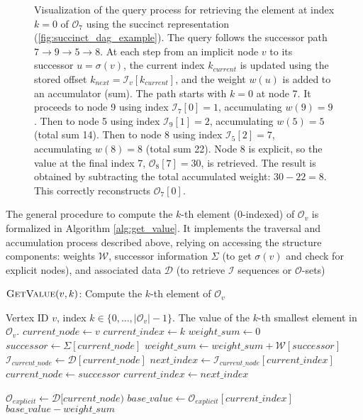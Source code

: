 \begin{figure}[htbp]
    \caption{Visualization of the query process for retrieving the element at index $k=0$ of $\mathcal{O}_7$ using the succinct representation (\autoref{fig:succinct_dag_example}). The query follows the successor path $7 \to 9 \to 5 \to 8$. At each step from an implicit node $v$ to its successor $u=\sigma(v)$, the current index $k_{current}$ is updated using the stored offset $k_{next} = \mathcal{I}_v[k_{current}]$, and the weight $w(u)$ is added to an accumulator (sum). The path starts with $k=0$ at node 7. It proceeds to node 9 using index $\mathcal{I}_7[0]=1$, accumulating $w(9)=9$. Then to node 5 using index $\mathcal{I}_9[1]=2$, accumulating $w(5)=5$ (total sum 14). Then to node 8 using index $\mathcal{I}_5[2]=7$, accumulating $w(8)=8$ (total sum 22). Node 8 is explicit, so the value at the final index 7, $\mathcal{O}_8[7]=30$, is retrieved. The result is obtained by subtracting the total accumulated weight: $30 - 22 = 8$. This correctly reconstructs $\mathcal{O}_7[0]$.}
    \label{fig:query_path_node7}
\end{figure}

The general procedure to compute the $k$-th element ($0$-indexed) of $\mathcal{O}_v$ is formalized in Algorithm \ref{alg:get_value}. It implements the traversal and accumulation process described above, relying on accessing the structure components: weights $\mathcal{W}$, successor information $\Sigma$ (to get $\sigma(v)$ and check for explicit nodes), and associated data $\mathcal{D}$ (to retrieve $\mathcal{I}$ sequences or $\mathcal{O}$-sets)

\begin{algorithm}
    \caption{$\textsc{GetValue}(v, k)$: Compute the $k$-th element of $\mathcal{O}_v$}
    \label{alg:get_value}
    \small
    \begin{algorithmic}[1]
        \Require Vertex ID $v$, index $k \in \{0, \dots, |\mathcal{O}_v|-1\}$.
        \Ensure The value of the $k$-th smallest element in $\mathcal{O}_v$.
        \State $current\_node \gets v$
        \State $current\_index \gets k$
        \State $weight\_sum \gets 0$
        \State $successor \gets \Sigma[current\_node]$
        \State $weight\_sum \gets weight\_sum + \mathcal{W}[successor]$
        \State $\mathcal{I}_{current\_node} \gets \mathcal{D}[current\_node]$
        \State $next\_index \gets \mathcal{I}_{current\_node}[current\_index]$
        \State $current\_node \gets successor$
        \State $current\_index \gets next\_index$
        \EndWhile

        \State $\mathcal{O}_{explicit} \gets \mathcal{D}[current\_node)$
        \State $base\_value \gets \mathcal{O}_{explicit}[current\_index]$
        \State \Return $base\_value - weight\_sum$
    \end{algorithmic}
\end{algorithm}

